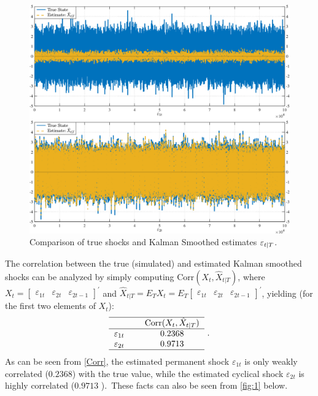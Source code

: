 \documentclass[a4paper,final,12pt]{article}
\begin{document}
\begin{figure}[h]
\centering
\includegraphics[width=1\textwidth,trim={0 0 0
0},clip,angle=00]{HP97_plots.pdf}
\caption{Comparison of true shocks and Kalman Smoothed estimates $\protect%
\varepsilon _{t|T}$.}
\label{fig:1}
\end{figure}
The correlation between the true (simulated) and estimated Kalman smoothed
shocks can be analyzed by simply computing $\mathrm{Corr}(X_{t},\hat{X}%
_{t|T})$, where $X_{t}=%
\begin{bmatrix}
\varepsilon _{1t} & \varepsilon _{2t} & \varepsilon _{2t-1}%
\end{bmatrix}%
^{\prime }$ and $\hat{X}_{t|T}=E_{T}X_{t}=E_{T}%
\begin{bmatrix}
\varepsilon _{1t} & \varepsilon _{2t} & \varepsilon _{2t-1}%
\end{bmatrix}%
^{\prime }$, yielding (for the first two elements of $X_{t}$):%
\begin{equation}
\begin{tabular}{lcc}
\hline
&  & $\mathrm{Corr}(X_{t},\hat{X}_{t|T})$ \\ \hline
$\varepsilon _{1t}$ &  & $0.2368$ \\ 
$\varepsilon _{2t}$ &  & $0.9713$ \\ \hline
\end{tabular}%
~.  \label{Corr}
\end{equation}%
As can be seen from \ref{Corr}, the estimated permanent shock $\varepsilon
_{1t}$ is only weakly correlated ($0.2368$) with the true value, while the
estimated cyclical shock $\varepsilon _{2t}$ is highly correlated ($0.9713$%
).\ These facts can also be seen from \autoref{fig:1} below.
\end{document}
